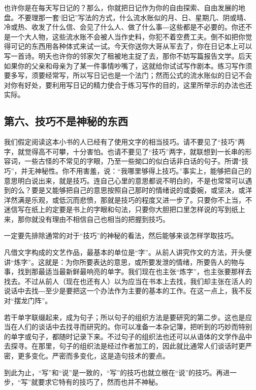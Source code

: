 \documentclass[fontset=fandol,12pt,a5paper]{ctexbook}
\begin{document}
也许你是在每天写日记的？那么，你就把日记作为你的自由探索、自由发展的地盘。不要理那一套‘旧记”写法的方式，什么流水账似的月、日、星期几、阴或晴、冷或热、收发了什么信、会见了什么人、做了什么事―这些都是不必要的。你还不是一个大人物，这些流水账不会被人当作史料，你犯不着空费工夫。倒不如把你觉得可记的东西用各种体式来试一试。今天你送你大哥从军去了，你在日记本上可以写一首诗。明夭也许你的邻家欠了租被地主捉了去，那你不妨写篇报告文学。后天如果你的父亲和母亲为了某一件事情吵嘴了，这就给你试试写作剧本。练习写作须要多写，须要经常写，所以写日记也是一个法门；然而公式的流水账似的日记不会对你有好处，要利用写日记的精力使合于练习写作的目的，这里所举示的办法也还实际。

\subsection{第六、技巧不是神秘的东西}
我们假定阅读这本小书的人已经有了使用文字的相当技巧。请不要见了“技巧”两字，就觉得高不可攀，十分害怕。也请不要见了“技巧”两字，就联想到一长串的形容词，一些古怪的不常见的字眼，乃至一些拗口的似白话非白话的句子。所谓“技巧”，并无神秘性。你不用害羞，说：“我哪里够得上技巧。”事实上，能够把自己的意思明白说出来，就是技巧。连自己心里的意思都说不明白的，不是也常常可以遇到的么？要是又能够把自己的意思按照自己那时的情绪说的或委婉，或坚决，或洋洋然满是乐观，或低沉而悲愤，那就是技巧的程度又进一步了。只要你不上当，不迷信写在纸上的定要是书上的字眼和句法，只要你大胆把口里怎样说的写到纸上来，那你就没有理由不相信自己也相当的把握到技巧。

一定要先排除通常的对于“技巧”的神秘的看法，然后能够来谈怎样学取技巧。

凡借文字构成的文艺作品，最基本的单位是“字”。从前人讲究作文的方法，开头便讲“炼字”。这就是：为你所要表达的意思，或所要发泄的情绪，所要告人的物与事，找到那最适当最新鲜最响亮的单字。我们现在也主张“炼字”，也主张要那样去找去。不过从前人（现在也还有人）以为应当在书本上去找，我们却主张在活人的说话中去找―至少是要把这一个办法作为主要的基本的工作。在这一点上，我不反对“摆龙门阵”。

若干单字联缀起来，成为句子；所以句子的组织方法是要研究的第二步。这也是应当在人们的谈话中去找寻而研究的。你可以准备一本杂记簿，把听到的巧妙而特别的单字或句子，都随时记录下来。不过句子的组织法也还可以从语体的文学作品中去探寻。在那里，句子的组织法是经过作者加工的，因此就比通常人们谈话时更严密，更多变化。严密而多变化，这是造句技术的要点。

到此为止，“写”和“说”是一致的，“写”的技巧也就立根在“说”的技巧。再进一步，“写”就要求它特有的技巧了，然而也并不神秘。
\end{document}
